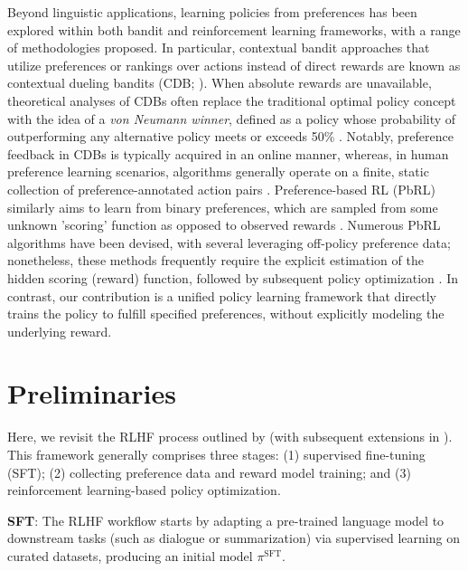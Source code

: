 Beyond linguistic applications, learning policies from preferences has been explored within both bandit and reinforcement learning frameworks, with a range of methodologies proposed. In particular, contextual bandit approaches that utilize preferences or rankings over actions instead of direct rewards are known as contextual dueling bandits (CDB; \cite{yue2012karmed,dudik2015contextual}). When absolute rewards are unavailable, theoretical analyses of CDBs often replace the traditional optimal policy concept with the idea of a \textit{von Neumann winner}, defined as a policy whose probability of outperforming any alternative policy meets or exceeds 50\% \citep{dudik2015contextual}. Notably, preference feedback in CDBs is typically acquired in an online manner, whereas, in human preference learning scenarios, algorithms generally operate on a finite, static collection of preference-annotated action pairs \citep{yan2022human}. Preference-based RL (PbRL) similarly aims to learn from binary preferences, which are sampled from some unknown 'scoring' function as opposed to observed rewards \citep{BusaFekete2014,ruiz2023dueling}. Numerous PbRL algorithms have been devised, with several leveraging off-policy preference data; nonetheless, these methods frequently require the explicit estimation of the hidden scoring (reward) function, followed by subsequent policy optimization \citep{jain2013learning,BusaFekete2014,christiano2017deep,sadigh2017active,kupcsik2018learning}. In contrast, our contribution is a unified policy learning framework that directly trains the policy to fulfill specified preferences, without explicitly modeling the underlying reward.

\section{Preliminaries}\label{section:prelims}

Here, we revisit the RLHF process outlined by \citeauthor{ziegler2020finetuning} (with subsequent extensions in \citep{stiennon2022learning, bai2022training, ouyang2022training}). This framework generally comprises three stages: (1) supervised fine-tuning (SFT); (2) collecting preference data and reward model training; and (3) reinforcement learning-based policy optimization.

\textbf{SFT}: The RLHF workflow starts by adapting a pre-trained language model to downstream tasks (such as dialogue or summarization) via supervised learning on curated datasets, producing an initial model $\pi^\text{SFT}$.

